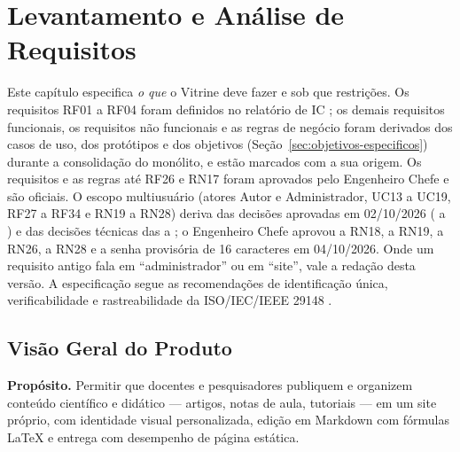 \chapter{Levantamento e Análise de Requisitos}\label{cap:requisitos}

Este capítulo especifica \emph{o que} o Vitrine deve fazer e sob que restrições. Os requisitos RF01 a RF04 foram definidos no relatório de IC \cite{reis2026ic}; os demais requisitos funcionais, os requisitos não funcionais e as regras de negócio foram derivados dos casos de uso, dos protótipos e dos objetivos (Seção~\ref{sec:objetivos-especificos}) durante a consolidação do monólito, e estão marcados com a sua origem. Os requisitos e as regras até RF26 e RN17 foram aprovados pelo Engenheiro Chefe e são oficiais. O escopo multiusuário (atores Autor e Administrador, UC13 a UC19, RF27 a RF34 e RN19 a RN28) deriva das decisões aprovadas em 02/10/2026 ( a ) e das decisões técnicas das  a ; o Engenheiro Chefe aprovou a RN18, a RN19, a RN26, a RN28 e a senha provisória de 16 caracteres em 04/10/2026. Onde um requisito antigo fala em ``administrador'' ou em ``site'', vale a redação desta versão. A especificação segue as recomendações de identificação única, verificabilidade e rastreabilidade da ISO/IEC/IEEE 29148 \cite{iso29148}.

\section{Visão Geral do Produto}\label{sec:visao-produto}

\textbf{Propósito.} Permitir que docentes e pesquisadores publiquem e organizem conteúdo científico e didático --- artigos, notas de aula, tutoriais --- em um site próprio, com identidade visual personalizada, edição em Markdown com fórmulas \LaTeX{} e entrega com desempenho de página estática.

